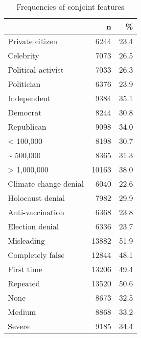 \begin{table*}

\caption{Frequencies of conjoint features\label{tbl:frequencies}}
\begin{tabular}[t]{lrr}
\toprule
  & n & \%\\
\midrule
Private citizen & 6244 & 23.4\\
Celebrity & 7073 & 26.5\\
Political activist & 7033 & 26.3\\
Politician & 6376 & 23.9\\
Independent & 9384 & 35.1\\
\addlinespace
Democrat & 8244 & 30.8\\
Republican & 9098 & 34.0\\
< 100,000 & 8198 & 30.7\\
\textasciitilde{} 500,000 & 8365 & 31.3\\
> 1,000,000 & 10163 & 38.0\\
\addlinespace
Climate change denial & 6040 & 22.6\\
Holocaust denial & 7982 & 29.9\\
Anti-vaccination & 6368 & 23.8\\
Election denial & 6336 & 23.7\\
Misleading & 13882 & 51.9\\
\addlinespace
Completely false & 12844 & 48.1\\
First time & 13206 & 49.4\\
Repeated & 13520 & 50.6\\
None & 8673 & 32.5\\
Medium & 8868 & 33.2\\
\addlinespace
Severe & 9185 & 34.4\\
\bottomrule
\end{tabular}
\end{table*}
